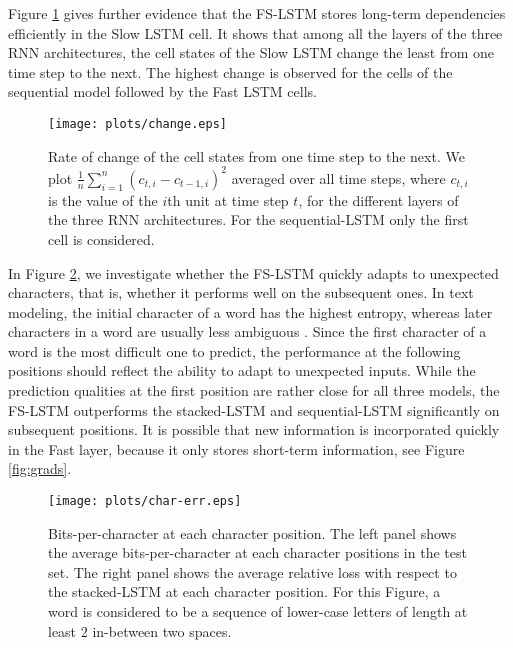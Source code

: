 \documentclass{article}
\begin{document}
 Figure \ref{fig:change} gives further evidence that the FS-LSTM stores long-term dependencies efficiently in the Slow LSTM cell. It shows that among all the layers of the three RNN architectures, the cell states of the Slow LSTM change the least from one time step to the next. The highest change is observed for the cells of the sequential model followed by the Fast LSTM cells. 


\begin{figure}
    \centering
    \texttt{[image: plots/change.eps]}
    \caption{Rate of change of the cell states from one time step to the next. We plot
    $\frac{1}{n}\sum^n_{i=1}(c_{t, i}-c_{t-1, i})^2$ averaged over all time steps, where $c_{t, i}$ is the value of the $i$th unit at time step $t$,  for the different layers of the three RNN architectures. For the sequential-LSTM only the first cell is considered. }
    \label{fig:change}
\end{figure}

In Figure \ref{fig:errors}, we investigate whether the FS-LSTM quickly adapts to unexpected characters, that is, whether it performs well on the subsequent ones.  In text modeling, the initial character of a word has the highest entropy, whereas later characters in a word are usually less ambiguous \cite{elman90entropy}. Since the first character of a word is the most difficult one to predict, the performance at the following positions should reflect the ability  to adapt to unexpected inputs.  While the prediction qualities at the first position are rather close for all three models, the FS-LSTM  outperforms the stacked-LSTM and sequential-LSTM significantly on subsequent positions. 
It is possible that new information is incorporated quickly in the Fast layer, because it only stores short-term information, see Figure \ref{fig:grads}.















\begin{figure}
    \centering
    \texttt{[image: plots/char-err.eps]}
    \caption{Bits-per-character at each character position. The left panel  shows the average bits-per-character at each character positions in the test set. The right panel shows the average relative loss with respect to the stacked-LSTM at each character position. For this Figure,  a word is considered to be a sequence of lower-case letters of length at least $2$ in-between two spaces. }
    \label{fig:errors}
\end{figure}
\end{document}
